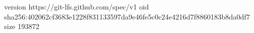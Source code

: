 version https://git-lfs.github.com/spec/v1
oid sha256:402062cf3683e1228f831133597da9e46fe5c0c24e4216d7f8860183b8da0df7
size 193872
